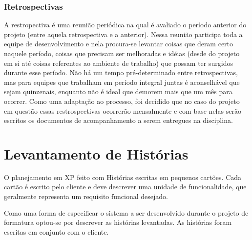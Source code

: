     \subsubsection{Retrospectivas}
      A restropectiva é uma reunião periódica na qual é avaliado o período anterior do projeto (entre aquela retrospectiva e a anterior). Nessa reunião participa toda a equipe de desenvolvimento e nela procura-se levantar coisas que deram certo naquele período, coisas que precisam ser melhoradas e idéias (desde do projeto em si até coisas referentes ao ambiente de trabalho) que possam ter surgidos durante esse período. Não há um tempo pré-determinado entre retrospectivas, mas para equipes que trabalham em período integral juntas é aconselhável que sejam quinzenais, enquanto não é ideal que demorem mais que um mês para ocorrer. Como uma adaptação ao processo, foi decidido que no caso do projeto em questão essas restrospectivas ocorrerão mensalmente e com base nelas serão escritos os documentos de acompanhamento a serem entregues na disciplina.

\section{Levantamento de Histórias}

  O planejamento em XP feito com Histórias escritas em pequenos cartões. Cada cartão é escrito pelo cliente e deve descrever uma unidade de funcionalidade, que geralmente representa um requisito funcional desejado\cite{sato07}.

  Como uma forma de especificar o sistema a ser desenvolvido durante o projeto de formatura optou-se por descrever as histórias levantadas. As histórias foram escritas em conjunto com o cliente.

